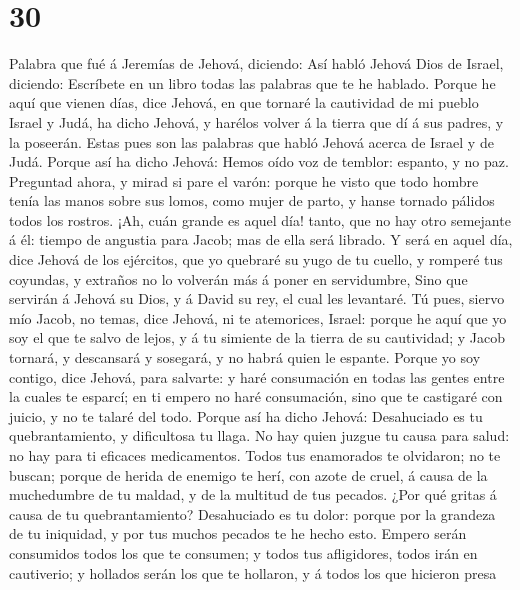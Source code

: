 \hypertarget{section-29}{%
\section{30}\label{section-29}}

 Palabra que fué á Jeremías de Jehová, diciendo:
 Así habló Jehová Dios de Israel, diciendo: Escríbete en un
libro todas las palabras que te he hablado.  Porque he aquí
que vienen días, dice Jehová, en que tornaré la cautividad de mi pueblo
Israel y Judá, ha dicho Jehová, y harélos volver á la tierra que dí á
sus padres, y la poseerán.  Estas pues son las palabras que
habló Jehová acerca de Israel y de Judá.  Porque así ha
dicho Jehová: Hemos oído voz de temblor: espanto, y no paz. 
Preguntad ahora, y mirad si pare el varón: porque he visto que todo
hombre tenía las manos sobre sus lomos, como mujer de parto, y hanse
tornado pálidos todos los rostros.  ¡Ah, cuán grande es
aquel día! tanto, que no hay otro semejante á él: tiempo de angustia
para Jacob; mas de ella será librado.  Y será en aquel día,
dice Jehová de los ejércitos, que yo quebraré su yugo de tu cuello, y
romperé tus coyundas, y extraños no lo volverán más á poner en
servidumbre,  Sino que servirán á Jehová su Dios, y á David
su rey, el cual les levantaré.  Tú pues, siervo mío Jacob,
no temas, dice Jehová, ni te atemorices, Israel: porque he aquí que yo
soy el que te salvo de lejos, y á tu simiente de la tierra de su
cautividad; y Jacob tornará, y descansará y sosegará, y no habrá quien
le espante.  Porque yo soy contigo, dice Jehová, para
salvarte: y haré consumación en todas las gentes entre la cuales te
esparcí; en ti empero no haré consumación, sino que te castigaré con
juicio, y no te talaré del todo.  Porque así ha dicho
Jehová: Desahuciado es tu quebrantamiento, y dificultosa tu llaga.
 No hay quien juzgue tu causa para salud: no hay para ti
eficaces medicamentos.  Todos tus enamorados te olvidaron;
no te buscan; porque de herida de enemigo te herí, con azote de cruel, á
causa de la muchedumbre de tu maldad, y de la multitud de tus pecados.
 ¿Por qué gritas á causa de tu quebrantamiento? Desahuciado
es tu dolor: porque por la grandeza de tu iniquidad, y por tus muchos
pecados te he hecho esto.  Empero serán consumidos todos
los que te consumen; y todos tus afligidores, todos irán en cautiverio;
y hollados serán los que te hollaron, y á todos los que hicieron presa
